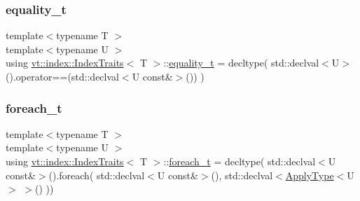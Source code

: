\mbox{\label{structvt_1_1index_1_1_index_traits_a87c63bbffab452de516eb2dbc93c07e3}} 
\subsubsection{\texorpdfstring{equality\+\_\+t}{equality\_t}}
{\footnotesize\ttfamily template$<$typename T $>$ \\
template$<$typename U $>$ \\
using \hyperlink{structvt_1_1index_1_1_index_traits}{vt\+::index\+::\+Index\+Traits}$<$ T $>$\+::\hyperlink{structvt_1_1index_1_1_index_traits_a87c63bbffab452de516eb2dbc93c07e3}{equality\+\_\+t} =  decltype( std\+::declval$<$U$>$().operator==(std\+::declval$<$U const\&$>$()) )}

\mbox{\label{structvt_1_1index_1_1_index_traits_a132ed4a131bbc5f9e410e203cf2e08ae}} 
\subsubsection{\texorpdfstring{foreach\+\_\+t}{foreach\_t}}
{\footnotesize\ttfamily template$<$typename T $>$ \\
template$<$typename U $>$ \\
using \hyperlink{structvt_1_1index_1_1_index_traits}{vt\+::index\+::\+Index\+Traits}$<$ T $>$\+::\hyperlink{structvt_1_1index_1_1_index_traits_a132ed4a131bbc5f9e410e203cf2e08ae}{foreach\+\_\+t} =  decltype( std\+::declval$<$U const\&$>$().foreach( std\+::declval$<$U const\&$>$(), std\+::declval$<$\hyperlink{structvt_1_1index_1_1_index_traits_ab13467c0c40bb0f17103d108cd08437f}{Apply\+Type}$<$U$>$ $>$() ))}

\mbox{\label{structvt_1_1index_1_1_index_traits_a9507b2186fbda410df0f7c685504e314}} 
